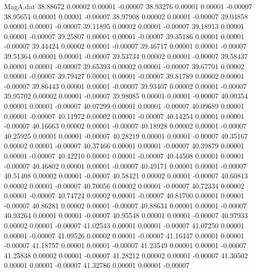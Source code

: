 \begin{filecontents}{MagA.dat}
  38.88672    0.00002    0.00001   -0.00007
  38.93276    0.00001    0.00001   -0.00007
  38.95651    0.00001    0.00001   -0.00007
  38.97908    0.00002    0.00001   -0.00007
  39.04858    0.00001    0.00001   -0.00007
  39.11895    0.00002    0.00001   -0.00007
  39.18913    0.00001    0.00001   -0.00007
  39.25807    0.00001    0.00001   -0.00007
  39.35186    0.00001    0.00001   -0.00007
  39.44424    0.00002    0.00001   -0.00007
  39.46717    0.00001    0.00001   -0.00007
  39.51364    0.00001    0.00001   -0.00007
  39.53734    0.00002    0.00001   -0.00007
  39.58437    0.00001    0.00001   -0.00007
  39.65393    0.00002    0.00001   -0.00007
  39.67701    0.00002    0.00001   -0.00007
  39.79427    0.00001    0.00001   -0.00007
  39.81789    0.00002    0.00001   -0.00007
  39.86443    0.00001    0.00001   -0.00007
  39.93407    0.00002    0.00001   -0.00007
  39.95702    0.00002    0.00001   -0.00007
  39.98085    0.00001    0.00001   -0.00007
  40.00354    0.00001    0.00001   -0.00007
  40.07299    0.00001    0.00001   -0.00007
  40.09689    0.00001    0.00001   -0.00007
  40.11972    0.00002    0.00001   -0.00007
  40.14254    0.00001    0.00001   -0.00007
  40.16663    0.00002    0.00001   -0.00007
  40.18928    0.00002    0.00001   -0.00007
  40.25925    0.00001    0.00001   -0.00007
  40.28219    0.00001    0.00001   -0.00007
  40.35167    0.00002    0.00001   -0.00007
  40.37466    0.00001    0.00001   -0.00007
  40.39879    0.00001    0.00001   -0.00007
  40.42210    0.00001    0.00001   -0.00007
  40.44508    0.00001    0.00001   -0.00007
  40.46802    0.00001    0.00001   -0.00007
  40.49171    0.00001    0.00001   -0.00007
  40.51408    0.00002    0.00001   -0.00007
  40.58421    0.00002    0.00001   -0.00007
  40.60813    0.00002    0.00001   -0.00007
  40.70056    0.00002    0.00001   -0.00007
  40.72334    0.00002    0.00001   -0.00007
  40.74724    0.00002    0.00001   -0.00007
  40.81700    0.00001    0.00001   -0.00007
  40.86281    0.00002    0.00001   -0.00007
  40.88634    0.00001    0.00001   -0.00007
  40.93264    0.00001    0.00001   -0.00007
  40.95548    0.00001    0.00001   -0.00007
  40.97933    0.00002    0.00001   -0.00007
  41.02543    0.00001    0.00001   -0.00007
  41.07250    0.00001    0.00001   -0.00007
  41.09526    0.00002    0.00001   -0.00007
  41.16447    0.00001    0.00001   -0.00007
  41.18757    0.00001    0.00001   -0.00007
  41.23549    0.00001    0.00001   -0.00007
  41.25838    0.00002    0.00001   -0.00007
  41.28212    0.00002    0.00001   -0.00007
  41.30502    0.00001    0.00001   -0.00007
  41.32786    0.00001    0.00001   -0.00007

\end{filecontents}
